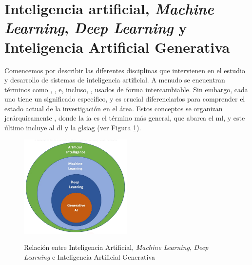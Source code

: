 
\section{Inteligencia artificial, \textit{Machine Learning}, \textit{Deep Learning} y Inteligencia Artificial Generativa}

Comencemos por describir las diferentes disciplinas que intervienen en el estudio y desarrollo de sistemas de inteligencia artificial. A menudo se encuentran términos como , ,  e, incluso, , usados de forma intercambiable. Sin embargo, cada uno tiene un significado específico, y es crucial diferenciarlos para comprender el estado actual de la investigación en el área. Estos conceptos se organizan jerárquicamente \citep{torresivinalsPythonDeepLearning2020}, donde la  \gls{ia} es el término más general, que abarca el \gls{ml}, y este último incluye al \gls{dl} y la gls{iag} (ver Figura \ref{fig:ai_ml_dl_gai}).

\begin{figure}[H]
    \caption[Relación entre Inteligencia Artificial, \textit{Machine Learning}, \textit{Deep Learning} y \textit{Generative AI}]{Relación entre Inteligencia Artificial, \textit{Machine Learning}, \textit{Deep Learning} e Inteligencia Artificial Generativa}
    \centering
    \includegraphics[width=0.5\textwidth]{./figuras/ai_ml_dl_gai.png}
    \label{fig:ai_ml_dl_gai}
\end{figure}

